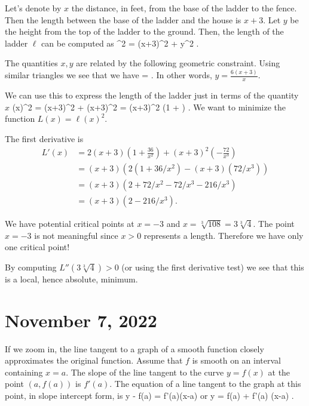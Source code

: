 \documentclass[11pt]{amsart}
\begin{document}
\newpage

Let's denote by $x$ the distance, in feet, from the base of the ladder to the fence. 
Then the length between the base of the ladder and the house is $x + 3$.
Let $y$ be the height from the top of the ladder to the ground.
Then, the length of the ladder $\ell$ can be computed as
\beqn
\ell^2 = (x+3)^2 + y^2 .
\eeqn

The quantities $x,y$ are related by the following geometric constraint.
Using similar triangles we see that we have
\beqn
{} =  .
\eeqn
In other words, $y = \frac{6(x+3)}{x}.$

We can use this to express the length of the ladder just in terms of the quantity $x$
\beqn
\ell(x)^2 = (x+3)^2 +  (x+3)^2 = (x+3)^2 \left(1 +  \right) .
\eeqn
We want to minimize the function $L(x) = \ell(x)^2$.

The first derivative is
\begin{align*}
L'(x) & = 2 (x+3) \left(1 + \frac{36}{x^2} \right) + (x+3)^2 \left(-\frac{72}{x^3}\right) \\
 & = (x+3) \left(2 (1 + 36/x^2) - (x+3) (72/x^3) \right) \\
 & = (x+3) \left(2 + 72/x^2 - 72/x^3 - 216/x^3 \right) \\
 & = (x+3) \left(2 - 216/x^3\right) .
\end{align*}

We have potential critical points at $x=-3$ and $x = \sqrt[3]{108} = 3 \sqrt[3]{4}$.
The point $x=-3$ is not meaningful since $x>0$ represents a length. 
Therefore we have only one critical point!

By computing $L''(3 \sqrt[3]{4})>0$ (or using the first derivative test) we see that this is a local, hence absolute, minimum. 

\newpage

\section*{November 7, 2022}

If we zoom in, the line tangent to a graph of a smooth function closely approximates the original function. 
Assume that $f$ is smooth on an interval containing $x=a$. 
The slope of the line tangent to the curve $y=f(x)$ at the point $(a,f(a))$ is $f'(a)$.
The equation of a line  tangent to the graph at this point, in slope intercept form, is
\beqn
y - f(a) = f'(a)(x-a)
\eeqn
or
\beqn
y = f(a) + f'(a) (x-a) .
\eeqn
\end{document}

